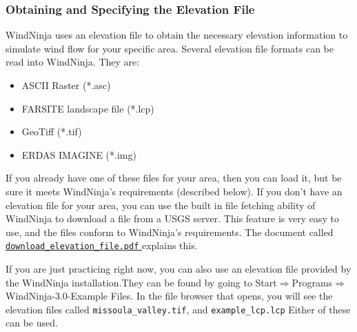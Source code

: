 \documentclass[12pt]{article}
\begin{document}
\subsubsection{Obtaining and Specifying the Elevation File}

WindNinja uses an elevation file to obtain the necessary elevation information to simulate wind flow for your specific area.  Several elevation file formats can be read into WindNinja.  They are:

\begin{itemize}
\item[]ASCII Raster (*.asc)
\item[]FARSITE landscape file (*.lcp)
\item[]GeoTiff (*.tif)
\item[]ERDAS IMAGINE (*.img)
\end{itemize}

If you already have one of these files for your area, then you can load it, but be sure it meets WindNinja's requirements (described below).  If you don't have an elevation file for your area, you can use the built in file fetching ability of WindNinja to download a file from a USGS server.  This feature is very easy to use, and the files conform to WindNinja's requirements.  The document called \href{https://weather.firelab.org/windninja/tutorials/download_elevation_file.pdf}{\texttt{download\_elevation\_file.pdf} } explains this.

If you are just practicing right now, you can also use an elevation file provided by the WindNinja installation.They can be found by going to Start$\Rightarrow$Programs$\Rightarrow$WindNinja-3.0-Example Files.  
In the file browser that opens, you will see the elevation files called \texttt{missoula\_valley.tif}, and \texttt{example\_lcp.lcp} Either of these can be used.
\end{document}
